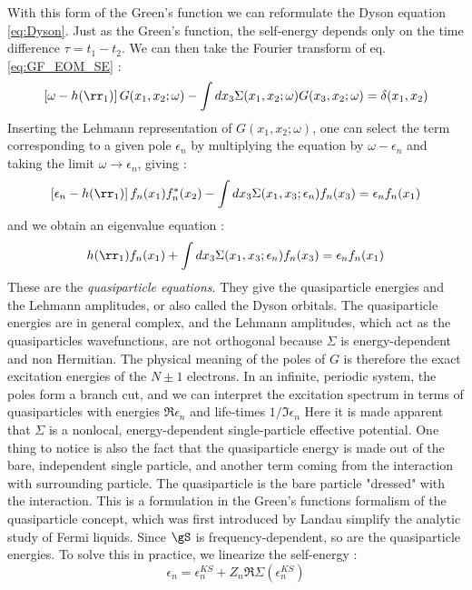With this form of the Green's function we can reformulate the Dyson equation \eqref{eq:Dyson}. Just as the Green's function, the self-energy depends only on the time difference $\tau = t_1 - t_2$. We can then take the Fourier transform of eq. \eqref{eq:GF_EOM_SE} :
\begin{equation}
	\left[ \omega - h(\rr_1) \right] G(x_1,x_2;\omega) - \int dx_3 \Sigma(x_1,x_2;\omega) G(x_3,x_2;\omega) = \delta(x_1,x_2)
\end{equation}
Inserting the Lehmann representation of $G(x_1,x_2;\omega)$, one can select the term corresponding to a given pole $\epsilon_n$ by multiplying the equation by $\omega - \epsilon_n$ and taking the limit $\omega \to \epsilon_n$, giving :
\begin{equation}
	\left[ \epsilon_n - h(\rr_1) \right] f_n(x_1)f^*_n(x_2) - \int dx_3 \Sigma(x_1,x_3;\epsilon_n) f_n(x_3) = \epsilon_n f_n(x_1)
\end{equation}
and we obtain an eigenvalue equation :
\begin{equation}
	h(\rr_1)f_n(x_1) + \int dx_3 \Sigma(x_1,x_3;\epsilon_n)f_n(x_3) = \epsilon_n f_n(x_1)
\end{equation}
These are the \textit{quasiparticle equations}. They give the quasiparticle energies and the Lehmann amplitudes, or also called the Dyson orbitals. The quasiparticle energies are in general complex, and the Lehmann amplitudes, which act as the quasiparticles wavefunctions, are not orthogonal because $\Sigma$ is energy-dependent and non Hermitian. The physical meaning of the poles of $G$ is therefore the exact excitation energies of the $N\pm1$ electrons. In an infinite, periodic system, the poles form a branch cut, and we can interpret the excitation spectrum in terms of quasiparticles with energies $\Re\epsilon_n$ and life-times $1/\Im\epsilon_n$
Here it is made apparent that $\Sigma$ is a nonlocal, energy-dependent single-particle effective potential. One thing to notice is also the fact that the quasiparticle energy is made out of the bare, independent single particle, and another term coming from the interaction with surrounding particle. The quasiparticle is the bare particle "dressed" with the interaction. This is a formulation in the Green's functions formalism of the quasiparticle concept, which was first introduced by Landau simplify the analytic study of Fermi liquids. \cite{landau1957oscillations}
Since $\gS$ is frequency-dependent, so are the quasiparticle energies. To solve this in practice, we linearize the self-energy :
\begin{equation}
	\epsilon_n = \epsilon^{KS}_n + Z_n\Re\Sigma(\epsilon^{KS}_n)
\end{equation} 
